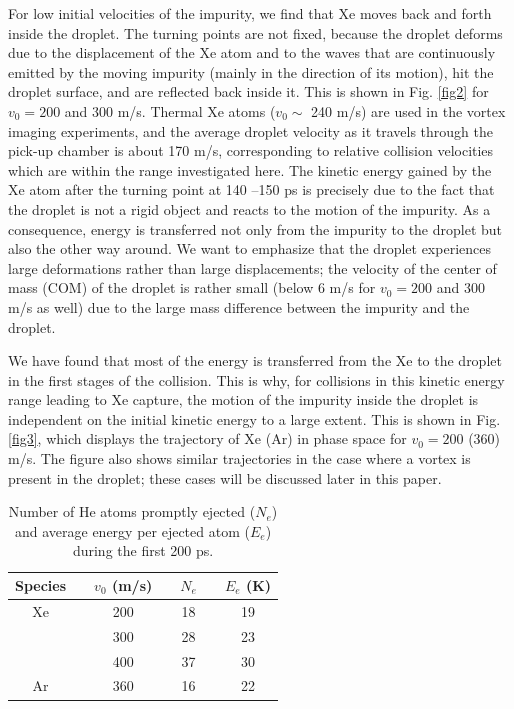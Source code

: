 For low initial velocities of the impurity, we find that
Xe moves back and forth inside the droplet.
The turning points are not fixed,
because the droplet deforms due to the displacement 
of the Xe atom and to the waves that are continuously emitted 
by the moving impurity
(mainly in the direction of its  motion),
hit the droplet surface, and are reflected back inside it.\cite{Cop16}
This is shown in 
Fig. \ref{fig2} for $v_0= 200$  and 300 m/s. 
Thermal Xe atoms ($v_0 \sim$ 240 m/s) 
are used in the vortex imaging 
experiments,\cite{Gom14,Jon16} and the average droplet velocity 
as it travels through the pick-up chamber is about 
170 m/s,\cite{Gom11} corresponding to relative collision
velocities which are within the range investigated here.
The kinetic energy gained by the Xe atom 
after the turning point at 140 --150 ps
is precisely due to the fact that the droplet is not a rigid 
object and reacts to the motion of the impurity.
As a consequence, energy is transferred not only from the impurity to 
the droplet but also the other way around. 
We want to emphasize that the droplet experiences 
large deformations rather than 
large displacements;
the velocity of the center of mass (COM) of the droplet is 
rather small (below 6 m/s  for $v_0= 200$ and 300 m/s as well) 
due to the large 
mass difference between the impurity and the droplet.

We have found that most of the energy is transferred from 
the Xe to the droplet in the first stages of the collision.
This is why, for collisions in this kinetic energy range 
leading to Xe capture, the motion of the impurity inside the droplet
is independent on the initial kinetic energy to a large extent.  
This is shown in Fig. \ref{fig3}, which displays the trajectory
of Xe (Ar) in phase space for $v_0= 200$ (360) m/s. 
The figure also shows similar trajectories in the case where a vortex 
is present in the droplet; these cases will be discussed later in this paper.

%
%
\begin{table}[!]
\small
\caption{\label{tab1} Number of He atoms promptly ejected ($N_e$)  and average energy per ejected atom
($E_e$) during the first 200 ps. }
\vspace{0.1 cm}
\begin{tabular}{c c cc c c  c}
\hline 
Species &\hspace{0.5 cm} & $v_0$ (m/s) &\hspace{0.5 cm}  & $N_e$ & \hspace{0.5 cm} & $E_e$  (K) \\
\hline
Xe  & &200 &  &18  & &19    \\
   && 300&  &28  &  &23   \\
   & &400 & &37 & &30 \\
   \hline
   Ar& & 360& & 16 & & 22 \\
\hline 
\end{tabular}
 
\end{table}

